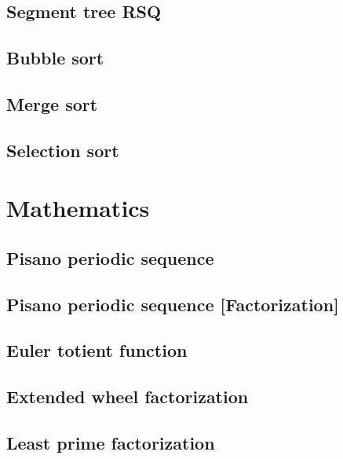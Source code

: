 \subsection{Segment tree RSQ}
\raggedbottom
\hrulefill
\subsection{Bubble sort}
\raggedbottom
\hrulefill
\subsection{Merge sort}
\raggedbottom
\hrulefill
\subsection{Selection sort}
\raggedbottom
\hrulefill


\section{Mathematics}
\subsection{Pisano periodic sequence}
\raggedbottom
\hrulefill
\subsection{Pisano periodic sequence [Factorization]}
\raggedbottom
\hrulefill
\subsection{Euler totient function}
\raggedbottom
\hrulefill
\subsection{Extended wheel factorization}
\raggedbottom
\hrulefill
\subsection{Least prime factorization}
\raggedbottom
\hrulefill
